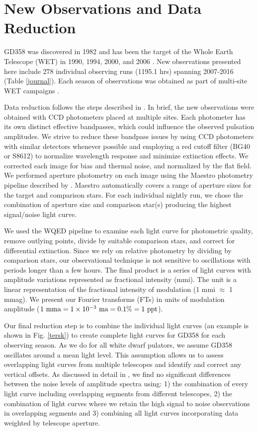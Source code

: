 \documentclass[12pt,preprint]{aastex}
\begin{document}
\section {New Observations and Data Reduction}\label{data}

GD358 was discovered in 1982 \citep{Winget82} and has been the target of the Whole 
Earth Telescope (WET) in 1990, 1994, 2000, and 2006 \citep{Provencal09, Kepler03,Winget94}. 
New observations presented here include 278 individual observing runs (1195.1 hrs) spanning 
2007-2016 (Table \ref{journal}). Each season of observations was obtained as part of 
multi-site WET campaigns \citep{wet90}. 

Data reduction follows the steps described in \citet{Provencal12}. In brief, the new observations 
were obtained with CCD photometers placed at multiple sites.  Each photometer has its own 
distinct effective bandpasses, which could influence the observed pulsation amplitudes. We strive 
to reduce these bandpass issues by using CCD photometers with similar detectors whenever possible and 
employing a red cutoff filter (BG40 or S8612) to normalize wavelength response and 
minimize extinction effects. We corrected each image for bias and thermal noise, and 
normalized by the flat field. We performed aperture photometry on each image 
using the Maestro photometry pipeline described by \citet{Dalessio10}. Maestro automatically covers a range of 
aperture sizes for the target and comparison stars. For each individual nightly run, we 
chose the combination of aperture size and comparison star(s) producing the highest 
signal/noise light curve. 

We used the WQED pipeline \citep{wqed} to examine each light curve for photometric 
quality, remove outlying points, divide by suitable comparison stars, and correct for 
differential extinction. Since we rely on relative photometry by dividing by comparison stars,
our observational technique is not sensitive to oscillations with periods longer than a few hours. 
The final product is a series of light curves with amplitude variations represented as fractional intensity (mmi). 
The unit is a linear representation of the fractional intensity of modulation (1 mmi $\approx$ 1 mmag). We present
our Fourier transforms (FTs) in units of modulation amplitude 
($1\ {\rm mma}=1 \times 10^{-3}\ {\rm ma} = 0.1 \% = 1\ {\rm ppt}$).

Our final reduction step is to combine the individual light curves 
(an example is shown in Fig. \ref{tersk}) to create complete light curves for GD358 for each 
observing season. As we do for all white dwarf pulators, we assume GD358 oscillates around 
a mean light level. This assumption allows us to assess overlapping light curves from multiple 
telescopes and identify and correct any vertical offsets. As discussed in detail in \citet{Provencal09}, we find 
no significant differences between the noise levels of amplitude spectra using: 
1) the combination of every light curve including overlapping 
segments from different telescopes, 2) the combination of light curves where we retain 
the high signal to noise observations in overlapping segments and 3) combining all light 
curves incorporating data weighted by telescope aperture.
\end{document}
